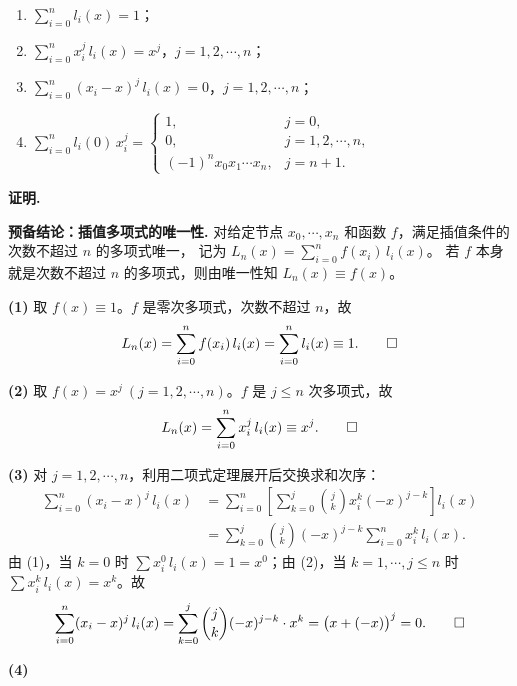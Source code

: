 \documentclass[UTF8,a4paper,11pt]{ctexart}
\newcommand*{\QED}{\hfill\ensuremath{\square}}
\begin{document}
\begin{enumerate}[label=(\arabic*),leftmargin=*,itemsep=8pt]
  \item $\displaystyle\sum_{i=0}^n l_i(x)=1$；

  \item $\displaystyle\sum_{i=0}^n x_i^j\,l_i(x)=x^j$，$j=1,2,\cdots,n$；

  \item $\displaystyle\sum_{i=0}^n(x_i-x)^j\,l_i(x)=0$，$j=1,2,\cdots,n$；

  \item $\displaystyle\sum_{i=0}^n l_i(0)\,x_i^j=
        \begin{cases}
          1, & j=0,\\[4pt]
          0, & j=1,2,\cdots,n,\\[4pt]
          (-1)^n x_0 x_1\cdots x_n, & j=n+1.
        \end{cases}$
\end{enumerate}

\medskip
\noindent\textbf{证明.}

\medskip
\noindent\textbf{预备结论：插值多项式的唯一性.}\quad
对给定节点 $x_0,\cdots,x_n$ 和函数 $f$，满足插值条件的次数不超过 $n$ 的多项式唯一，
记为 $L_n(x)=\sum_{i=0}^n f(x_i)\,l_i(x)$。
若 $f$ 本身就是次数不超过 $n$ 的多项式，则由唯一性知 $L_n(x)\equiv f(x)$。

\medskip
\noindent\textbf{(1)}\quad
取 $f(x)\equiv 1$。$f$ 是零次多项式，次数不超过 $n$，故
\[
  L_n(x) = \sum_{i=0}^n f(x_i)\,l_i(x) = \sum_{i=0}^n l_i(x) \equiv 1.\qquad\QED
\]

\medskip
\noindent\textbf{(2)}\quad
取 $f(x)=x^j\ (j=1,2,\cdots,n)$。$f$ 是 $j\leqslant n$ 次多项式，故
\[
  L_n(x) = \sum_{i=0}^n x_i^j\,l_i(x) \equiv x^j.\qquad\QED
\]

\medskip
\noindent\textbf{(3)}\quad
对 $j=1,2,\cdots,n$，利用二项式定理展开后交换求和次序：
\begin{align*}
  \sum_{i=0}^n(x_i-x)^j\,l_i(x)
  &= \sum_{i=0}^n\left[\sum_{k=0}^{j}\binom{j}{k}x_i^k(-x)^{j-k}\right]l_i(x)\\
  &= \sum_{k=0}^{j}\binom{j}{k}(-x)^{j-k}\sum_{i=0}^n x_i^k\,l_i(x).
\end{align*}
由 (1)，当 $k=0$ 时 $\sum x_i^0\,l_i(x)=1=x^0$；由 (2)，当 $k=1,\cdots,j\leqslant n$ 时 $\sum x_i^k\,l_i(x)=x^k$。故
\[
  \sum_{i=0}^n(x_i-x)^j\,l_i(x)
  = \sum_{k=0}^{j}\binom{j}{k}(-x)^{j-k}\cdot x^k
  = \bigl(x+(-x)\bigr)^j = 0.\qquad\QED
\]

\medskip
\noindent\textbf{(4)}\quad
\end{document}
